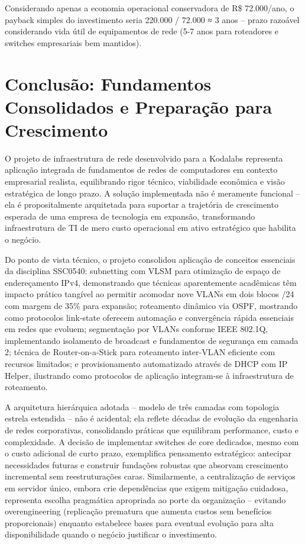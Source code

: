 \documentclass[12pt,a4paper]{article}
\begin{document}
Considerando apenas a economia operacional conservadora de R\$ 72.000/ano, o payback simples do investimento seria 220.000 / 72.000 ≈ 3 anos -- prazo razoável considerando vida útil de equipamentos de rede (5-7 anos para roteadores e switches empresariais bem mantidos).

\section{Conclusão: Fundamentos Consolidados e Preparação para Crescimento}

O projeto de infraestrutura de rede desenvolvido para a Kodalabs representa aplicação integrada de fundamentos de redes de computadores em contexto empresarial realista, equilibrando rigor técnico, viabilidade econômica e visão estratégica de longo prazo. A solução implementada não é meramente funcional -- ela é propositalmente arquitetada para suportar a trajetória de crescimento esperada de uma empresa de tecnologia em expansão, transformando infraestrutura de TI de mero custo operacional em ativo estratégico que habilita o negócio.

Do ponto de vista técnico, o projeto consolidou aplicação de conceitos essenciais da disciplina SSC0540: subnetting com VLSM para otimização de espaço de endereçamento IPv4, demonstrando que técnicas aparentemente acadêmicas têm impacto prático tangível ao permitir acomodar nove VLANs em dois blocos /24 com margem de 35\% para expansão; roteamento dinâmico via OSPF, mostrando como protocolos link-state oferecem automação e convergência rápida essenciais em redes que evoluem; segmentação por VLANs conforme IEEE 802.1Q, implementando isolamento de broadcast e fundamentos de segurança em camada 2; técnica de Router-on-a-Stick para roteamento inter-VLAN eficiente com recursos limitados; e provisionamento automatizado através de DHCP com IP Helper, ilustrando como protocolos de aplicação integram-se à infraestrutura de roteamento.

A arquitetura hierárquica adotada -- modelo de três camadas com topologia estrela estendida -- não é acidental; ela reflete décadas de evolução da engenharia de redes corporativas, consolidando práticas que equilibram performance, custo e complexidade. A decisão de implementar switches de core dedicados, mesmo com o custo adicional de curto prazo, exemplifica pensamento estratégico: antecipar necessidades futuras e construir fundações robustas que absorvam crescimento incremental sem reestruturações caras. Similarmente, a centralização de serviços em servidor único, embora crie dependências que exigem mitigação cuidadosa, representa escolha pragmática apropriada ao porte da organização -- evitando overengineering (replicação prematura que aumenta custos sem benefícios proporcionais) enquanto estabelece bases para eventual evolução para alta disponibilidade quando o negócio justificar o investimento.
\end{document}
